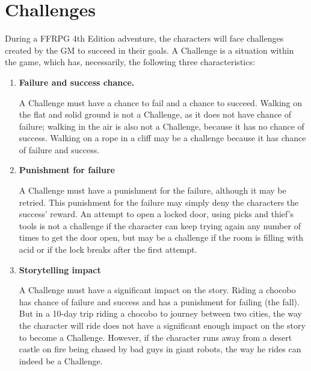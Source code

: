 \section{Challenges}\label{sec:challenges}
\begin{multicols}{2}
During a FFRPG 4th Edition adventure, the characters will face challenges created by the GM to succeed in their goals. A Challenge is a situation within the game, which has, necessarily, the following three characteristics:

\begin{enumerate}[label=\alph*]
\item \textbf{Failure and success chance.}

A Challenge must have a chance to fail and a chance to succeed. Walking on the flat and solid ground is not a Challenge, as it does not have chance of failure; walking in the air is also not a Challenge, because it has no chance of success. Walking on a rope in a cliff may be a challenge because it has chance of failure and success.

\item \textbf{Punishment for failure}

A Challenge must have a punishment for the failure, although it may be retried. This punishment for the failure may simply deny the characters the success’ reward. An attempt to open a locked door, using picks and thief’s tools is not a challenge if the character can keep trying again any number of times to get the door open, but may be a challenge if the room is filling with acid or if the lock breaks after the first attempt.

\item \textbf{Storytelling impact}

A Challenge must have a significant impact on the story. Riding a chocobo has chance of failure and success and has a punishment for failing (the fall). But in a 10-day trip riding a chocobo to journey between two cities, the way the character will ride does not have a significant enough impact on the story to become a Challenge. However, if the character runs away from a desert castle on fire being chased by bad guys in giant robots, the way he rides can indeed be a Challenge.
\end{enumerate}

\begin{center}
\end{center}


\end{multicols}
